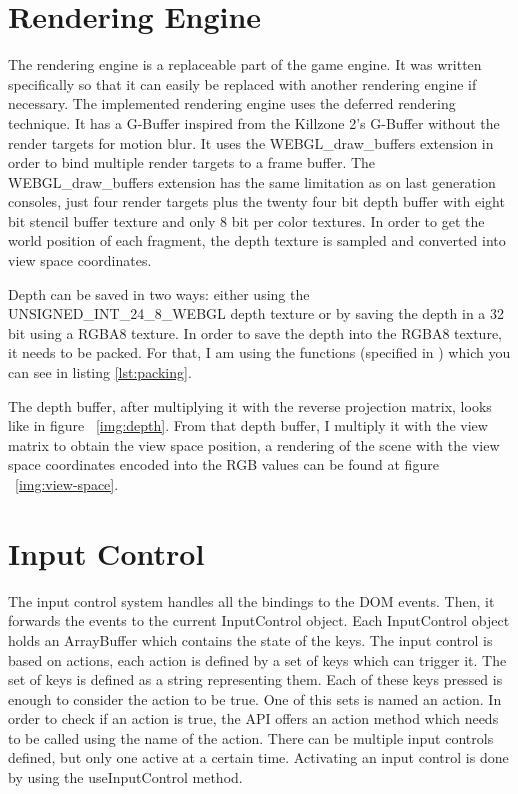 \section{Rendering Engine}

The rendering engine is a replaceable part of the game engine. It was written specifically so that it can easily be replaced with another rendering engine if necessary.
The implemented rendering engine uses the deferred rendering technique. It has a G-Buffer inspired from the Killzone 2’s G-Buffer without the render targets for motion blur.
It uses the WEBGL\_draw\_buffers extension in order to bind multiple render targets to a frame buffer. The WEBGL\_draw\_buffers extension has the same limitation as on last generation consoles, just four render targets plus the twenty four bit depth buffer with eight bit stencil buffer texture and only 8 bit per color textures.
In order to get the world position of each fragment, the depth texture is sampled and converted into view space coordinates.

Depth can be saved in two ways: either using the UNSIGNED\_INT\_24\_8\_WEBGL depth texture or by saving the depth in a 32 bit using a RGBA8 texture.
In order to save the depth into the RGBA8 texture, it needs to be packed. For that, I am using the functions (specified in \cite{engel14}) which you can see in listing \ref{lst:packing}.

\lstset{caption=RGBA8 packing, label=lst:packing}


The depth buffer, after multiplying it with the reverse projection matrix, looks like in figure ~\ref{img:depth}.
From that depth buffer, I multiply it with the view matrix to obtain the view space position, a rendering of the scene with the view space coordinates encoded into the RGB values can be found at figure ~\ref{img:view-space}.

\section{Input Control}

The input control system handles all the bindings to the DOM events. Then, it forwards the events to the current InputControl object. 
Each InputControl object holds an ArrayBuffer which contains the state of the keys. The input control is based on actions, each action is defined by a set of keys which can trigger it. The set of keys is defined as a string representing them. Each of these keys pressed is enough to consider the action to be true. One of this sets is named an action. In order to check if an action is true, the API offers an action method which needs to be called using the name of the action. There can be multiple input controls defined, but only one active at a certain time. Activating an input control is done by using the useInputControl method. 

